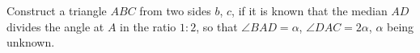 Construct a triangle $ABC$ from two sides $b$, $c$, if it is known that the median $AD$ divides the angle at $A$ in the ratio $1 : 2$, so that $\angle BAD = \alpha$, $\angle DAC = 2\alpha$, $\alpha$ being unknown.
